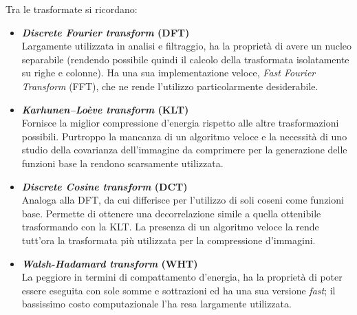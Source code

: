 Tra le trasformate si ricordano:

\begin{itemize}
  
  \item \textbf{\emph{Discrete Fourier transform} (DFT)}\\
    Largamente utilizzata in analisi e filtraggio, ha la proprietà di avere un 
    nucleo separabile (rendendo possibile quindi il calcolo della trasformata 
    isolatamente su righe e colonne). Ha una sua implementazione veloce, 
    \emph{Fast Fourier Transform} (FFT), che ne rende l'utilizzo 
    particolarmente 
    desiderabile.
    
  \item \textbf{\emph{Karhunen–Loève transform} (KLT)}\\
    Fornisce la miglior compressione d'energia rispetto alle altre 
    trasformazioni possibili. Purtroppo la mancanza di un algoritmo veloce e la 
    necessità di uno studio della covarianza dell'immagine da comprimere per la 
    generazione delle funzioni base la rendono scarsamente utilizzata.
    
  \item \textbf{\emph{Discrete Cosine transform} (DCT)}\\
    Analoga alla DFT, da cui differisce per l'utilizzo di soli coseni come 
    funzioni base.
    Permette di ottenere una decorrelazione simile a quella ottenibile %
    trasformando con la KLT. La presenza di un algoritmo veloce la rende 
    tutt'ora la trasformata più utilizzata per la compressione d'immagini.
   
  \item \textbf{\emph{Walsh-Hadamard transform} (WHT)}\\
    La peggiore in termini di compattamento d'energia, ha la proprietà di poter 
    essere eseguita con sole somme e sottrazioni ed ha una sua versione 
    \emph{fast}; il bassissimo costo computazionale l'ha resa largamente 
    utilizzata.
    
\end{itemize}


